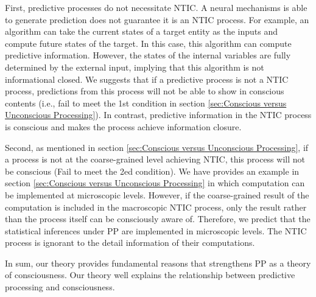 \documentclass[utf8]{article}
\begin{document}
    		First, predictive processes do not necessitate NTIC. A neural mechanisms is able to generate prediction does not guarantee it is an NTIC process. For example, an algorithm can take the current states of a target entity as the inputs and compute future states of the target. In this case, this algorithm can compute predictive information. However, the states of the internal variables are fully determined by the external input, implying that this algorithm is not informational closed. We suggests that if a predictive process is not a NTIC process, predictions from this process will not be able to show in conscious contents (i.e., fail to meet the 1\lowercase{st} condition in section \ref{sec:Conscious versus Unconscious Processing}). In contrast, predictive information in the NTIC process is conscious and makes the process achieve information closure. 
    		
    		Second, as mentioned in section \ref{sec:Conscious versus Unconscious Processing}, if a process is not at the coarse-grained level achieving NTIC, this process will not be conscious (Fail to meet the 2\lowercase{ed} condition). We have provides an example in section \ref{sec:Conscious versus Unconscious Processing} in which computation can be implemented at microscopic levels. However, if the coarse-grained result of the computation is included in the macroscopic NTIC process, only the result rather than the process itself can be consciously aware of. Therefore, we predict that the statistical inferences under PP are implemented in microscopic levels. The NTIC process is ignorant to the detail information of their computations. 
    
            In sum, our theory provides fundamental reasons that strengthens PP as a theory of consciousness. Our theory well explains the relationship between predictive processing and consciousness.
\end{document}
